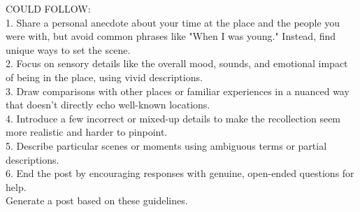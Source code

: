 \begin{tcolorbox}
COULD FOLLOW:\\
1. Share a personal anecdote about your time at the place and the people you were with, but avoid common phrases like "When I was young." Instead, find unique ways to set the scene.\\
2. Focus on sensory details like the overall mood, sounds, and emotional impact of being in the place, using vivid descriptions.\\
3. Draw comparisons with other places or familiar experiences in a nuanced way that doesn't directly echo well-known locations.\\
4. Introduce a few incorrect or mixed-up details to make the recollection seem more realistic and harder to pinpoint.\\
5. Describe particular scenes or moments using ambiguous terms or partial descriptions.\\
6. End the post by encouraging responses with genuine, open-ended questions for help.\\

Generate a post based on these guidelines.

\end{tcolorbox}



\newpage
